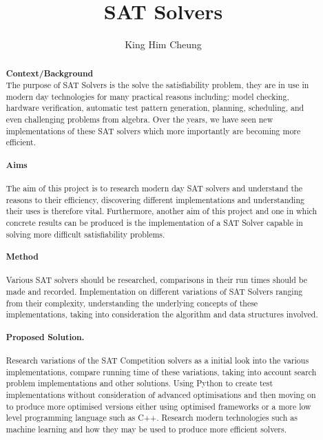 \documentclass[12pt,a4paper]{article}
\title{SAT Solvers}
\author{King Him Cheung}
\date{}
\begin{document}
\maketitle

\begin{abstract}\newline\newline
{\bf Context/Background}\newline \\
The purpose of SAT Solvers is the solve the satisfiability problem, they are in use in modern day technologies for many practical reasons including: model checking, hardware verification, automatic test pattern generation, planning, scheduling, and even challenging problems from algebra. Over the years, we have seen new implementations of these SAT solvers which more importantly are becoming more efficient.  
\\\\
{\bf Aims}\\\\
The aim of this project is to research modern day SAT solvers and understand the reasons to their efficiency, discovering different implementations and understanding their uses is therefore vital. Furthermore, another aim of this project and one in which concrete results can be produced is the implementation of a SAT Solver capable in solving more difficult satisfiability problems.
\\\\
{\bf Method}\\\\
Various SAT solvers should be researched, comparisons in their run times should be made and recorded. Implementation on different variations of SAT Solvers ranging from their complexity, understanding the underlying concepts of these implementations, taking into consideration the algorithm and data structures involved.   
\\\\
{\bf Proposed Solution.}\\\\
Research variations of the SAT Competition solvers as a initial look into the various implementations, compare running time of these variations, taking into account search problem implementations and other solutions.\newline
Using Python to create test implementations without consideration of advanced optimisations and then moving on to produce more optimised versions either using optimised frameworks or a more low level programming language such as C++. \newline
Research modern technologies such as machine learning and how they may be used to produce more efficient solvers.



\end{abstract}
\end{document}
